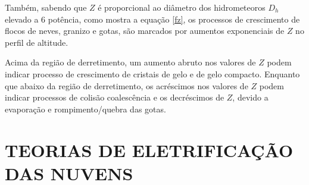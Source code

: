 

Também, sabendo que $Z$ é proporcional ao diâmetro dos hidrometeoros $D_h$ elevado a 6 potência, como mostra a equação \ref{fz}, os processos de crescimento de flocos de neves, granizo e gotas, são marcados por aumentos exponenciais de $Z$ no perfil de altitude. 


Acima da região de derretimento, um aumento abruto nos valores de $Z$ podem indicar processo de crescimento de cristais de gelo e de gelo compacto. Enquanto que abaixo da região de derretimento, os acréscimos nos valores de $Z$ podem indicar processos de colisão coalescência e os decréscimos de $Z$, devido a evaporação e rompimento/quebra das gotas. 




\section{TEORIAS DE ELETRIFICAÇÃO DAS NUVENS}

